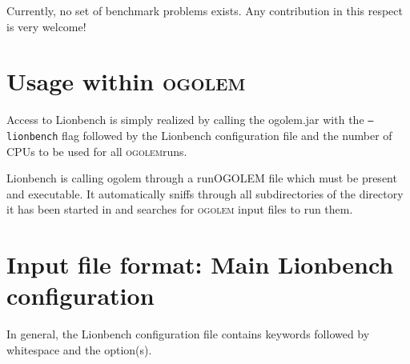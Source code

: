 \documentclass[a4paper,10pt]{scrbook}
\newcommand{\ogo}{\textsc{ogolem}}
\begin{document}
Currently, no set of benchmark problems exists. Any contribution in this 
respect is very welcome!

\section{Usage within \textsc{ogolem}}
Access to Lionbench is simply realized by calling the ogolem.jar with the 
\texttt{--lionbench} flag followed by the Lionbench configuration file and the 
number of CPUs to be used for all \ogo runs.

Lionbench is calling ogolem through a runOGOLEM file which must be present and 
executable. It automatically sniffs through all subdirectories of the directory 
it has been started in and searches for \ogo{} input files to run them.

\section{Input file format: Main Lionbench configuration}
In general, the Lionbench configuration file contains keywords followed by 
whitespace and the option(s).
\end{document}
